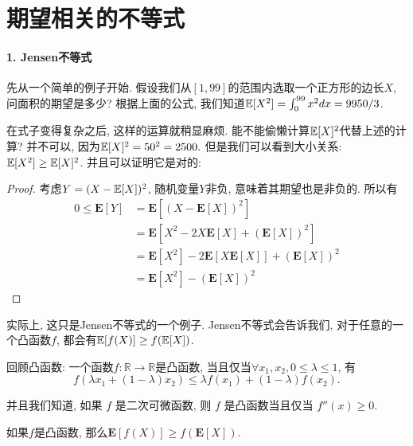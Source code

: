 \section{期望相关的不等式}

\paragraph{1. Jensen不等式} 先从一个简单的例子开始. 假设我们从$[1,99]$的范围内选取一个正方形的边长$X$, 问面积的期望是多少? 根据上面的公式, 我们知道$\mathbb E[X^2]= \int_{0}^{99} x^2 dx = 9950/3$. 

在式子变得复杂之后, 这样的运算就稍显麻烦. 能不能偷懒计算$\mathbb E[X]^2$代替上述的计算? 并不可以, 因为$\mathbb E[X]^2=50^2=2500.$ 但是我们可以看到大小关系: $\mathbb E[X^2]\geq \mathbb E[X]^2$. 并且可以证明它是对的: 
\begin{proof}
    考虑$Y=(X-\mathbb E[X])^2$, 随机变量$Y$非负, 意味着其期望也是非负的. 所以有
    $$
\begin{aligned}
0 \leq \mathbf{E}[Y] & =\mathbf{E}\left[(X-\mathbf{E}[X])^2\right] \\
& =\mathbf{E}\left[X^2-2 X \mathbf{E}[X]+(\mathbf{E}[X])^2\right] \\
& =\mathbf{E}\left[X^2\right]-2 \mathbf{E}[X \mathbf{E}[X]]+(\mathbf{E}[X])^2 \\
& =\mathbf{E}\left[X^2\right]-(\mathbf{E}[X])^2
\end{aligned}
$$
\end{proof}

实际上, 这只是Jensen不等式的一个例子. Jensen不等式会告诉我们, 对于任意的一个凸函数$f$, 都会有$\mathbb E[f(X)]\geq f(\mathbb E[X])$. 

\begin{asidebox}
回顾凸函数: 一个函数$f:\mathbb R \to \mathbb R$是凸函数, 当且仅当$\forall x_1, x_2, 0\leq \lambda \leq 1$, 有$$
f\left(\lambda x_1+(1-\lambda) x_2\right) \leq \lambda f\left(x_1\right)+(1-\lambda) f\left(x_2\right) .
$$

并且我们知道, 如果 $f$ 是二次可微函数, 则 $f$ 是凸函数当且仅当 $f''(x)\geq 0$. 
\end{asidebox}

\begin{theorem}
    如果$f$是凸函数, 那么$\mathbf{E}[f(X)] \geq f(\mathbf{E}[X])$. 
\end{theorem}

